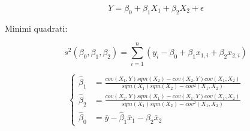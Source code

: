 $$
Y = \beta_0 + \beta_1 X_1+\beta_2X_2 + \epsilon
$$

Minimi quadrati:

$$
s^2(\beta_0, \beta_1, \beta_2) = \sum\limits_{i=1}^n(y_i - \beta_0 + \beta_1 x_{1,i}+\beta_2 x_{2,i} )
$$

$$
\begin{cases}
\hat{\beta}_1 &= \frac{cov(X_1,Y)sqm(X_2) - cov(X_2, Y)cov(X_1,X_2)}{sqm(X_1)sqm(X_2)- cov^2(X_1,X_2)} \\
\hat{\beta}_2 &= \frac{cov(X_2,Y)sqm(X_1) - cov(X_1, Y)cov(X_1,X_2)}{sqm(X_1)sqm(X_2)- cov^2(X_1,X_2)}  \\
\hat{\beta}_0 &= \bar{y} - \hat{\beta}_1\bar{x}_1 - \hat{\beta}_2\bar{x}_2
\end{cases}
$$